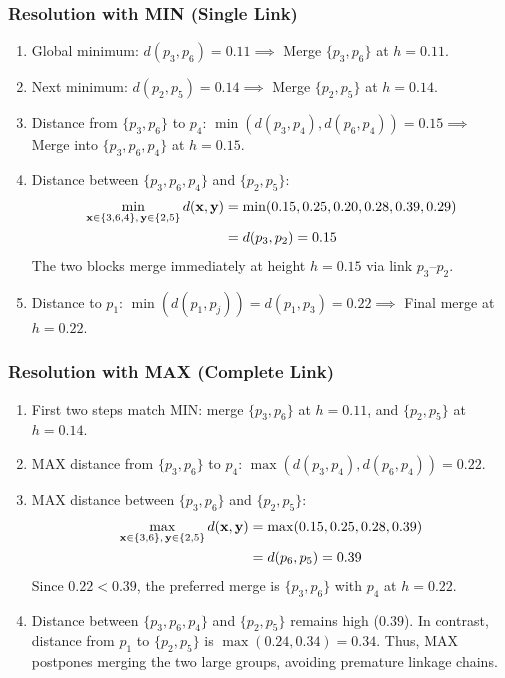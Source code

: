 \subsubsection{Resolution with MIN (Single Link)}
\begin{enumerate}
    \item Global minimum: $d(p_3, p_6) = 0.11 \implies$ Merge $\{p_3, p_6\}$ at $h = 0.11$.
    \item Next minimum: $d(p_2, p_5) = 0.14 \implies$ Merge $\{p_2, p_5\}$ at $h = 0.14$.
    \item Distance from $\{p_3, p_6\}$ to $p_4$: $\min(d(p_3, p_4), d(p_6, p_4)) = 0.15 \implies$ Merge into $\{p_3, p_6, p_4\}$ at $h = 0.15$.
    \item Distance between $\{p_3, p_6, p_4\}$ and $\{p_2, p_5\}$:
    \begin{align}
        \min_{\mathbf{x} \in \{3,6,4\}, \, \mathbf{y} \in \{2,5\}} d(\mathbf{x}, \mathbf{y}) &= \min(0.15, 0.25, 0.20, 0.28, 0.39, 0.29) \notag \\
        &= d(p_3, p_2) = 0.15
    \end{align}
    The two blocks merge immediately at height $h = 0.15$ via link $p_3$--$p_2$.
    \item Distance to $p_1$: $\min(d(p_1, p_j)) = d(p_1, p_3) = 0.22 \implies$ Final merge at $h = 0.22$.
\end{enumerate}

\subsubsection{Resolution with MAX (Complete Link)}
\begin{enumerate}
    \item First two steps match MIN: merge $\{p_3, p_6\}$ at $h = 0.11$, and $\{p_2, p_5\}$ at $h = 0.14$.
    \item MAX distance from $\{p_3, p_6\}$ to $p_4$: $\max(d(p_3, p_4), d(p_6, p_4)) = 0.22$.
    \item MAX distance between $\{p_3, p_6\}$ and $\{p_2, p_5\}$:
    \begin{align}
        \max_{\mathbf{x} \in \{3,6\}, \, \mathbf{y} \in \{2,5\}} d(\mathbf{x}, \mathbf{y}) &= \max(0.15, 0.25, 0.28, 0.39) \notag \\
        &= d(p_6, p_5) = 0.39
    \end{align}
    Since $0.22 < 0.39$, the preferred merge is $\{p_3, p_6\}$ with $p_4$ at $h = 0.22$.
    \item Distance between $\{p_3, p_6, p_4\}$ and $\{p_2, p_5\}$ remains high ($0.39$). In contrast, distance from $p_1$ to $\{p_2, p_5\}$ is $\max(0.24, 0.34) = 0.34$. Thus, MAX postpones merging the two large groups, avoiding premature linkage chains.
\end{enumerate}

